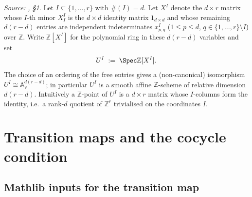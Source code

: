 \begin{definition}\leanok
  \label{def:gr_affine_chart}
  \textit{Source: \cite{nitsure-hilbert-quot}, \S 1.}
  Let \(I \subseteq \{1, \dots, r\}\) with \(\#(I) = d\). Let \(X^I\) denote the
  \(d \times r\) matrix whose \(I\)-th minor \(X^I_I\) is the \(d \times d\)
  identity matrix \(1_{d \times d}\) and whose remaining \(d(r - d)\) entries are
  independent indeterminates \(x^I_{p,q}\) (\(1 \le p \le d\),
  \(q \in \{1,\dots,r\} \setminus I\)) over \(\mathbb{Z}\). Write
  \(\mathbb{Z}[X^I]\) for the polynomial ring in these \(d(r-d)\) variables and
  set
  \[
    U^I \;:=\; \Spec \mathbb{Z}[X^I].
  \]
  The choice of an ordering of the free entries gives a (non-canonical)
  isomorphism \(U^I \cong \mathbb{A}^{d(r-d)}_{\mathbb{Z}}\); in particular
  \(U^I\) is a smooth affine \(\mathbb{Z}\)-scheme of relative dimension
  \(d(r-d)\). Intuitively a \(\mathbb{Z}\)-point of \(U^I\) is a \(d \times r\)
  matrix whose \(I\)-columns form the identity, i.e.\ a rank-\(d\) quotient of
  \(\mathbb{Z}^{r}\) trivialised on the coordinates \(I\).
\end{definition}

\section{Transition maps and the cocycle condition}
\label{sec:gr_transition}

\subsection*{Mathlib inputs for the transition map}

